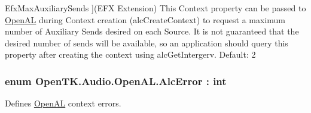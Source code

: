 \begin{Desc}
\begin{description}
{\hypertarget{namespace_open_t_k_1_1_audio_1_1_open_a_l_a4c57e167c6b3b29f8ec5c826be530017a7ff17bb3868ebe884974e808eab3acf9}{Efx\-Max\-Auxiliary\-Sends}\label{namespace_open_t_k_1_1_audio_1_1_open_a_l_a4c57e167c6b3b29f8ec5c826be530017a7ff17bb3868ebe884974e808eab3acf9}
}](E\-F\-X Extension) This Context property can be passed to \hyperlink{namespace_open_t_k_1_1_audio_1_1_open_a_l}{Open\-A\-L} during Context creation (alc\-Create\-Context) to request a maximum number of Auxiliary Sends desired on each Source. It is not guaranteed that the desired number of sends will be available, so an application should query this property after creating the context using alc\-Get\-Intergerv. Default\-: 2\end{description}
\end{Desc}
\hypertarget{namespace_open_t_k_1_1_audio_1_1_open_a_l_a2684b7587fe0457a0203cacbdace7bc5}{
\subsubsection[{Alc\-Error}]{\setlength{\rightskip}{0pt plus 5cm}enum {\bf Open\-T\-K.\-Audio.\-Open\-A\-L.\-Alc\-Error} \-: int}}\label{namespace_open_t_k_1_1_audio_1_1_open_a_l_a2684b7587fe0457a0203cacbdace7bc5}


Defines \hyperlink{namespace_open_t_k_1_1_audio_1_1_open_a_l}{Open\-A\-L} context errors. 

